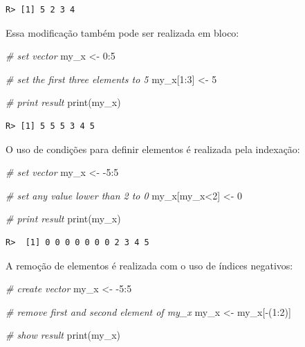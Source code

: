 \documentclass[
  11pt,
]{book}
\newenvironment{Shaded}{\begin{snugshade}}{\end{snugshade}}
\newcommand{\CommentTok}[1]{\textcolor[rgb]{0.37,0.37,0.37}{\textit{#1}}}
\newcommand{\DecValTok}[1]{\textcolor[rgb]{0.06,0.06,0.06}{#1}}
\newcommand{\FunctionTok}[1]{\textcolor[rgb]{0,0,0}{#1}}
\newcommand{\NormalTok}[1]{#1}
\newcommand{\OtherTok}[1]{\textcolor[rgb]{0.37,0.37,0.37}{#1}}
\newcommand{\SpecialCharTok}[1]{\textcolor[rgb]{0,0,0}{#1}}
\begin{document}
\begin{verbatim}
R> [1] 5 2 3 4
\end{verbatim}

Essa modificação também pode ser realizada em bloco:

\begin{Shaded}
\begin{Highlighting}[]
\CommentTok{\# set vector}
\NormalTok{my\_x }\OtherTok{\textless{}{-}} \DecValTok{0}\SpecialCharTok{:}\DecValTok{5}

\CommentTok{\# set the first three elements to 5}
\NormalTok{my\_x[}\DecValTok{1}\SpecialCharTok{:}\DecValTok{3}\NormalTok{] }\OtherTok{\textless{}{-}} \DecValTok{5}

\CommentTok{\# print result}
\FunctionTok{print}\NormalTok{(my\_x)}
\end{Highlighting}
\end{Shaded}

\begin{verbatim}
R> [1] 5 5 5 3 4 5
\end{verbatim}

O uso de condições para definir elementos é realizada pela indexação:

\begin{Shaded}
\begin{Highlighting}[]
\CommentTok{\# set vector}
\NormalTok{my\_x }\OtherTok{\textless{}{-}} \SpecialCharTok{{-}}\DecValTok{5}\SpecialCharTok{:}\DecValTok{5}

\CommentTok{\# set any value lower than 2 to 0}
\NormalTok{my\_x[my\_x}\SpecialCharTok{\textless{}}\DecValTok{2}\NormalTok{] }\OtherTok{\textless{}{-}} \DecValTok{0}

\CommentTok{\# print result}
\FunctionTok{print}\NormalTok{(my\_x)}
\end{Highlighting}
\end{Shaded}

\begin{verbatim}
R>  [1] 0 0 0 0 0 0 0 2 3 4 5
\end{verbatim}

A remoção de elementos é realizada com o uso de índices negativos:

\begin{Shaded}
\begin{Highlighting}[]
\CommentTok{\# create vector}
\NormalTok{my\_x }\OtherTok{\textless{}{-}} \SpecialCharTok{{-}}\DecValTok{5}\SpecialCharTok{:}\DecValTok{5}

\CommentTok{\# remove first and second element of my\_x}
\NormalTok{my\_x }\OtherTok{\textless{}{-}}\NormalTok{ my\_x[}\SpecialCharTok{{-}}\NormalTok{(}\DecValTok{1}\SpecialCharTok{:}\DecValTok{2}\NormalTok{)]}

\CommentTok{\# show result}
\FunctionTok{print}\NormalTok{(my\_x)}
\end{Highlighting}
\end{Shaded}
\end{document}
